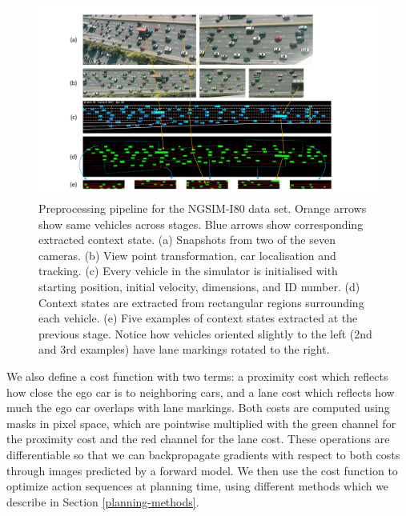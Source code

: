 \documentclass{article} %
\begin{document}
\begin{figure}
  \centering
  \includegraphics[width=\textwidth]{figures/driving/I-80.pdf}
  \caption{
    Preprocessing pipeline for the NGSIM-I80 data set.
    Orange arrows show same vehicles across stages.
    Blue arrows show corresponding extracted context state.
    (a) Snapshots from two of the seven cameras.
    (b) View point transformation, car localisation and tracking.
    (c) Every vehicle in the simulator is initialised with starting position, initial velocity, dimensions, and ID number.
    (d) Context states are extracted from rectangular regions surrounding each vehicle.
    (e) Five examples of context states extracted at the previous stage.
    Notice how vehicles oriented slightly to the left (2nd and 3rd examples) have lane markings rotated to the right.
  }
\label{I-80}
\end{figure}

We also define a cost function with two terms: a proximity cost which reflects how close the ego car is to neighboring cars, and a lane cost which reflects how much the ego car overlaps with lane markings. %
Both costs are computed using masks in pixel space, which are pointwise multiplied with the green channel for the proximity cost and the red channel for the lane cost.
These operations are differentiable so that we can backpropagate gradients with respect to both costs through images predicted by a forward model.
We then use the cost function to optimize action sequences at planning time, using different methods which we describe in Section \ref{planning-methods}.
\end{document}
